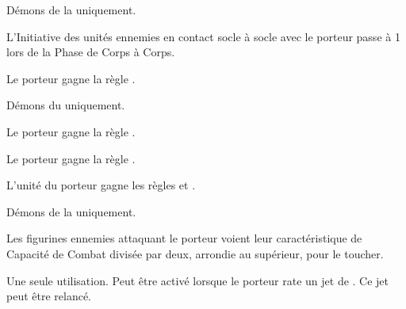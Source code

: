 \begin{multicols}{2}
Démons de la \textbf{\pestilence} uniquement.

L'Initiative des unités ennemies en contact socle à socle avec le porteur passe à 1 lors de la Phase de Corps à Corps.

Le porteur gagne la règle .

Démons du \textbf{\wrath} uniquement.

Le porteur gagne la règle .

Le porteur gagne la règle .

L'unité du porteur gagne les règles \hardtarget{} et .

Démons de la \textbf{\dlust} uniquement.

Les figurines ennemies attaquant le porteur voient leur caractéristique de Capacité de Combat divisée par deux, arrondie au supérieur, pour le toucher.

Une seule utilisation. Peut être activé lorsque le porteur rate un jet de \wardsave{}. Ce jet peut être relancé.

\endpricelist

\end{multicols}


